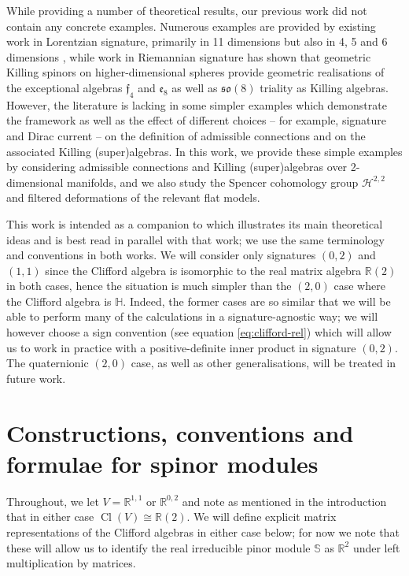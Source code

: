 \documentclass[10pt,a4paper]{amsart}
\numberwithin{equation}{section}
\newcommand{\fso}{\mathfrak{so}}
\newcommand{\RR}{\mathbb{R}}
\newcommand{\HH}{\mathbb{H}}
\newcommand{\bbS}{\mathbb{S}}
\newcommand{\cH}{\mathcal{H}}
\newcommand{\1}{\mathbbm{1}}
\DeclareMathOperator{\Cl}{Cl}
\begin{document}
While providing a number of theoretical results, our previous work \cite{Beckett2024_2} did not contain any concrete examples. Numerous examples are provided by existing work in Lorentzian signature, primarily in 11 dimensions \cite{Figueroa-OFarrill2016,Figueroa-OFarrill2017_1,Figueroa-OFarrill2017,Santi2022} but also in 4, 5 and 6 dimensions \cite{Beckett2019,deMedeiros2016,deMedeiros2018}, while work in Riemannian signature \cite{Figueroa-OFarrill2008_except} has shown that geometric Killing spinors on higher-dimensional spheres provide geometric realisations of the exceptional algebras $\mathfrak{f}_4$ and $\mathfrak{e}_8$ as well as $\fso(8)$ triality as Killing algebras. However, the literature is lacking in some simpler examples which demonstrate the framework as well as the effect of different choices -- for example, signature and Dirac current -- on the definition of admissible connections and on the associated Killing (super)algebras. In this work, we provide these simple examples by considering admissible connections and Killing (super)algebras over 2-dimensional manifolds, and we also study the Spencer cohomology group $\cH^{2,2}$ and filtered deformations of the relevant flat models.

This work is intended as a companion to \cite{Beckett2024_2} which illustrates its main theoretical ideas and is best read in parallel with that work; we use the same terminology and conventions in both works. We will consider only signatures $(0,2)$ and $(1,1)$ since the Clifford algebra is isomorphic to the real matrix algebra $\RR(2)$ in both cases, hence the situation is much simpler than the $(2,0)$ case where the Clifford algebra is $\HH$. Indeed, the former cases are so similar that we will be able to perform many of the calculations in a signature-agnostic way; we will however choose a sign convention (see equation \eqref{eq:clifford-rel}) which will allow us to work in practice with a positive-definite inner product in signature $(0,2)$. The quaternionic $(2,0)$ case, as well as other generalisations, will be treated in future work.

\section{Constructions, conventions and formulae for spinor modules}

Throughout, we let $V=\RR^{1,1}$ or $\RR^{0,2}$ and note as mentioned in the introduction that in either case $\Cl(V)\cong\RR(2)$. We will define explicit matrix representations of the Clifford algebras in either case below; for now we note that these will allow us to identify the real irreducible pinor module $\bbS$ as $\RR^2$ under left multiplication by matrices.
\end{document}
